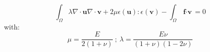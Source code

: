 \documentclass{article}
\begin{document}
$$
\int_{\Omega}{
	  \lambda\nabla\cdot\textbf{u}\nabla\cdot\textbf{v}
	+ 2\mu\epsilon(\textbf{u}):\epsilon(\textbf{v})
}
- \int_{\Omega}{\textbf{f}\cdot\textbf{v}}
= 0
$$
with:
$$
\mu = \frac{E}{2(1+\nu)}
\ ;\ 
\lambda = \frac{E\nu}{(1+\nu)(1-2\nu)}
$$
\end{document}
